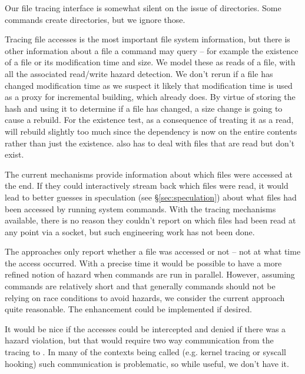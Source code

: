 Our file tracing interface is somewhat silent on the issue of directories. Some commands create directories, but we ignore those.

Tracing file accesses is the most important file system information, but there is other information about a file a command may query -- for example the existence of a file or its modification time and size. We model these as reads of a file, with all the associated read/write hazard detection. %
We don't rerun if a file has changed modification time as we suspect it likely that modification time is used as a proxy for incremental building, which \Rattle already does. By virtue of \Rattle storing the hash and using it to determine if a file has changed, a size change is going to cause a rebuild. For the existence test, as a consequence of treating it as a read, \Rattle will rebuild slightly too much since the dependency is now on the entire contents rather than just the existence.  \Rattle also has to deal with files that are read but don't exist.



The current mechanisms provide information about which files were accessed at the end. If they could interactively stream back which files were read, it would lead to better guesses in speculation (see \S\ref{sec:speculation}) about what files had been accessed by running system commands. With the tracing mechanisms available, there is no reason they couldn't report on which files had been read at any point via a socket, but such engineering work has not been done.

The approaches only report whether a file was accessed or not -- not at what time the access occurred. With a precise time it would be possible to have a more refined notion of hazard when commands are run in parallel. However, assuming commands are relatively short and that generally commands should not be relying on race conditions to avoid hazards, we consider the current approach quite reasonable. The enhancement could be implemented if desired.

It would be nice if the accesses could be intercepted and denied if there was a hazard violation, but that would require two way communication from the tracing to \Rattle. In many of the contexts being called (e.g. kernel tracing or syscall hooking) such communication is problematic, so while useful, we don't have it.

